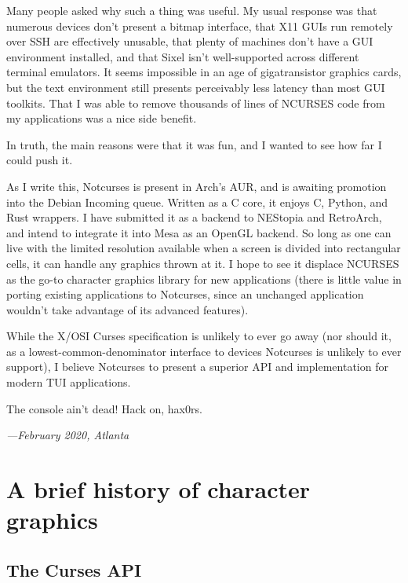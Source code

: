 \documentclass[letterpaper,10pt]{article}
\newcommand\CC{C\nolinebreak\hspace{-.05em}\raisebox{.4ex}{\relsize{-3}{\textbf{+}}}\nolinebreak\hspace{-.10em}\raisebox{.4ex}{\relsize{-3}{\textbf{+}}}\hspace{.2em}}
\begin{document}
Many people asked why such a thing was useful. My usual response was that
numerous devices don't present a bitmap interface, that X11 GUIs run remotely
over SSH are effectively unusable, that plenty of machines don't have a GUI
environment installed, and that Sixel isn't well-supported across different
terminal emulators. It seems impossible in an age of gigatransistor graphics
cards, but the text environment still presents perceivably less latency
than most GUI toolkits. That I was able to remove thousands of lines
of NCURSES code from my applications was a nice side benefit.

In truth, the main reasons were that it was fun, and I wanted to see how far
I could push it.

As I write this, Notcurses is present in Arch's AUR, and is awaiting promotion
into the Debian Incoming queue. Written as a C core, it enjoys \CC, Python, and
Rust wrappers. I have submitted it as a backend to NEStopia and RetroArch, and
intend to integrate it into Mesa as an OpenGL backend. So long as one can live
with the limited resolution available when a screen is divided into rectangular
cells, it can handle any graphics thrown at it. I hope to see it displace
NCURSES as the go-to character graphics library for new applications (there is
little value in porting existing applications to Notcurses, since an unchanged
application wouldn't take advantage of its advanced features).

While the X/OSI Curses specification is unlikely to ever go away (nor should
it, as a lowest-common-denominator interface to devices Notcurses is unlikely
to ever support), I believe Notcurses to present a superior API and
implementation for modern TUI applications.

The console ain't dead! Hack on, hax0rs.

\begin{flushright}
  \textit{---February 2020, Atlanta}
\end{flushright}

\newpage

\section{A brief history of character graphics}
\subsection{The Curses API}

\newpage
\end{document}
